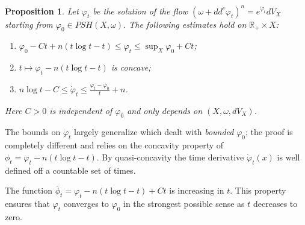 \documentclass[11pt]{amsart}
\numberwithin{equation}{section}
\newtheorem{prop}[theorem]{Proposition}
\newcommand{\R}{\mathbb R}
\newcommand{\f}{\varphi}
\begin{document}
\begin{prop} \label{pro:concave}
Let $\f_t$ be the solution of the flow $(\omega+dd^c \f_t)^n=e^{\dot{\f}_t} dV_X$ 
starting from  $\f_0 \in PSH(X,\omega)$.
The following estimates hold on $\R_+ \times X$:

\smallskip

\begin{enumerate}
\item $\f_0-Ct +n(t \log t-t) \leq \f_t \leq \sup_X \f_0 +Ct$;

\smallskip

\item $t \mapsto \f_t-n(t \log t-t)$ is concave;

\medskip

\item $n \log t -C \leq \dot{\f}_t\leq \frac{\f_t-\f_0}{t}+n$.
\end{enumerate}
Here $C>0$ is independent of $\f_0$ and only depends on $(X,\omega,dV_X)$.
\end{prop}


The bounds on $\dot{\f}_t$ largely generalize \cite[Lemma 3.2]{ST17} which dealt with {\it bounded} $\f_0$; 
the proof is  completely different and relies on the concavity property of $\phi_t=\f_t-n(t \log t-t)$.
By quasi-concavity the time derivative $\dot{\f}_t(x)$  is well defined off a countable set of times.

\smallskip

The function $\tilde{\phi_t}=\f_t-n(t \log t-t)+Ct$  is increasing in $t$.
This  property ensures that $\f_t$ converges to $\f_0$ in the strongest
possible sense as $t$ decreases to zero.
\end{document}
